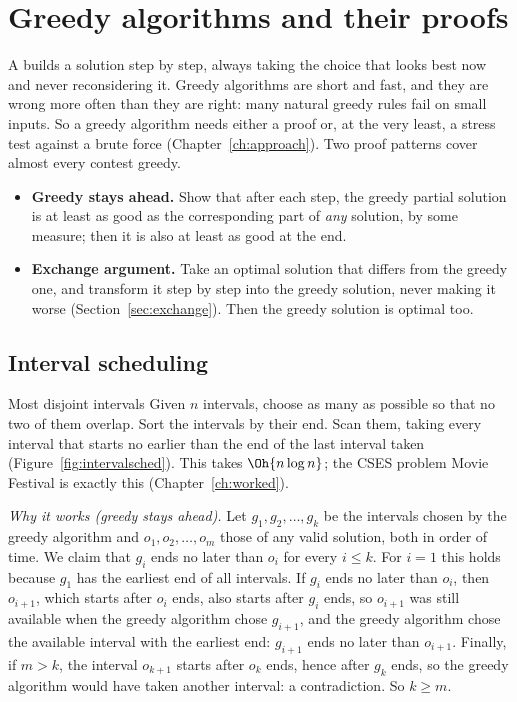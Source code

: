\section[Greedy algorithms and their proofs]{Greedy algorithms and their proofs \hfill \silver}\label{sec:greedy}

A  builds a solution step by step, always taking the choice that looks best now and never
reconsidering it. Greedy algorithms are short and fast, and they are wrong more often than they are right: many natural greedy
rules fail on small inputs. So a greedy algorithm needs either a proof or, at the very least, a stress test against a brute
force (Chapter~\ref{ch:approach}). Two proof patterns cover almost every contest greedy.

\begin{itemize}
  \item \textbf{Greedy stays ahead.} Show that after each step, the greedy partial solution is at least as good as the
        corresponding part of \emph{any} solution, by some measure; then it is also at least as good at the end.
  \item \textbf{Exchange argument.} Take an optimal solution that differs from the greedy one, and transform it step by step
        into the greedy solution, never making it worse (Section~\ref{sec:exchange}). Then the greedy solution is optimal
        too.
\end{itemize}

\subsection{Interval scheduling}

\begin{problem}{Most disjoint intervals}
Given $n$ intervals, choose as many as possible so that no two of them overlap.
\solution Sort the intervals by their end. Scan them, taking every interval that starts no earlier than the end of the last
interval taken (Figure~\ref{fig:intervalsched}). This takes $\Oh{n\log n}$; the CSES problem Movie Festival is exactly this
(Chapter~\ref{ch:worked}).
\end{problem}

\emph{Why it works (greedy stays ahead).} Let $g_1, g_2, \ldots, g_k$ be the intervals chosen by the greedy algorithm and
$o_1, o_2, \ldots, o_m$ those of any valid solution, both in order of time. We claim that $g_i$ ends no later than $o_i$ for
every $i \le k$. For $i = 1$ this holds because $g_1$ has the earliest end of all intervals. If $g_{i}$ ends no later than
$o_i$, then $o_{i+1}$, which starts after $o_i$ ends, also starts after $g_i$ ends, so $o_{i+1}$ was still available when
the greedy algorithm chose $g_{i+1}$, and the greedy algorithm chose the available interval with the earliest end: $g_{i+1}$
ends no later than $o_{i+1}$. Finally, if $m > k$, the interval $o_{k+1}$ starts after $o_k$ ends, hence after $g_k$ ends,
so the greedy algorithm would have taken another interval: a contradiction. So $k \ge m$.

